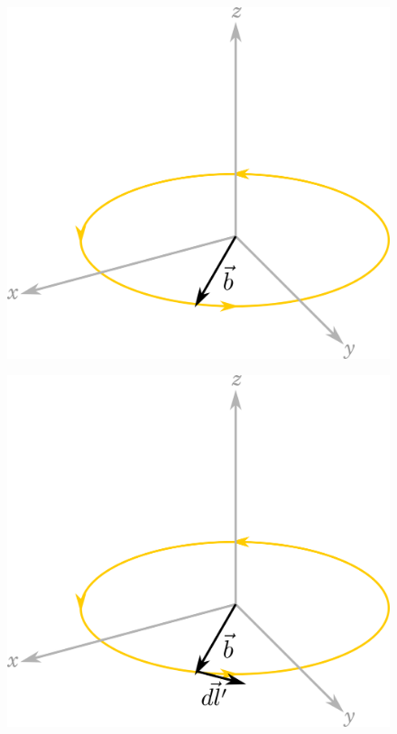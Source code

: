 \documentclass[10pt,aspectratio=169]{beamer}
\begin{document}
	\begin{frame}
		\begin{figure}[!htb]
			\centering
			\includegraphics[scale=0.6]{dip-1}
		\end{figure}
	\end{frame}

	\begin{frame}
		\begin{figure}[!htb]
			\centering
			\includegraphics[scale=0.6]{dip-2}
		\end{figure}
	\end{frame}
	
\end{document}
